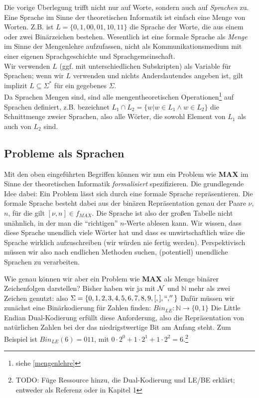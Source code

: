 Die vorige Überlegung trifft nicht nur auf Worte, sondern auch auf \emph{Sprachen} zu.
Eine Sprache im Sinne der theoretischen Informatik ist einfach eine Menge von Worten.
Z.B. ist $L = \{0, 1, 00, 01, 10, 11 \}$ die Sprache der Worte,
die aus einem oder zwei Binärzeichen bestehen.
Wesentlich ist eine formale Sprache als \emph{Menge} im Sinne der Mengenlehre aufzufassen, 
nicht als Kommunikationsmedium mit einer eigenen Sprachgeschichte und Sprachgemeinschaft.\\

\noindent
Wir verwenden $L$ (ggf. mit unterschiedlichen Subskripten) als Variable für Sprachen;
wenn wir $L$ verwenden und nichts Anderslautendes angeben ist,
gilt implizit $L \subseteq \Sigma^*$ für ein gegebenes $\Sigma$.\\

\noindent
Da Sprachen Mengen sind,
sind alle mengentheoretischen Operationen\footnote{siehe \autoref{mengenlehre}}
auf Sprachen definiert,
z.B. bezeichnet $L_1 \cap L_2 = \{w | w \in L_1 \wedge w \in L_2\}$
die Schnittmenge zweier Sprachen, also alle Wörter,
die sowohl Element von $L_1$ als auch von $L_2$ sind.

\subsection{Probleme als Sprachen}\label{subsec:problemeSprachen}
Mit den oben eingeführten Begriffen können
wir nun ein Problem wie \textbf{MAX} im Sinne der theoretischen Informatik
\emph{formalisiert} spezifizieren.
Die grundlegende Idee dabei: Ein Problem lässt sich durch eine formale Sprache repräsentieren. 
Die formale Sprache besteht dabei aus der binären Repräsentation genau der Paare $\nu$, $n$,
für die gilt $[\nu, n] \in f_{MAX}$. 
Die Sprache ist also der großen Tabelle nicht unähnlich,
in der man die ``richtigen'' $n$-Werte ablesen kann.
Wir wissen, dass diese Sprache unendlich viele Wörter hat und dass es unwirtschaftlich wäre
die Sprache wirklich aufzuschreiben (wir würden nie fertig werden).
Perspektivisch müssen wir also nach endlichen Methoden suchen,
(potentiell) unendliche Sprachen zu verarbeiten.

Wie genau können wir aber ein Problem wie \textbf{MAX}
als Menge binärer Zeichenfolgen darstellen?
Bisher haben wir ja mit $\cal{N}$ und $\mathbb{N}$ mehr als zwei Zeichen genutzt:
also $\Sigma = \{0,1,2,3,4,5,6,7,8,9,[,],``,''\}$
Dafür müssen wir zunächst eine Binärkodierung für Zahlen finden:
$Bin_{LE}: \mathbb{N} \rightarrow \{0,1\}$
Die Little Endian Dual-Kodierung erfüllt diese Anforderung,
also die Repräsentation von natürlichen Zahlen bei der
das niedrigstwertige Bit am Anfang steht.
Zum Beispiel ist $Bin_{LE}(6) = 011$, mit 
$
0 \cdot 2^0
+ 1 \cdot 2^1
+ 1 \cdot 2^2
= 6
$.\footnote{TODO: Füge Ressource hinzu, die Dual-Kodierung und LE/BE erklärt;
entweder als Referenz oder in Kapitel 1}

